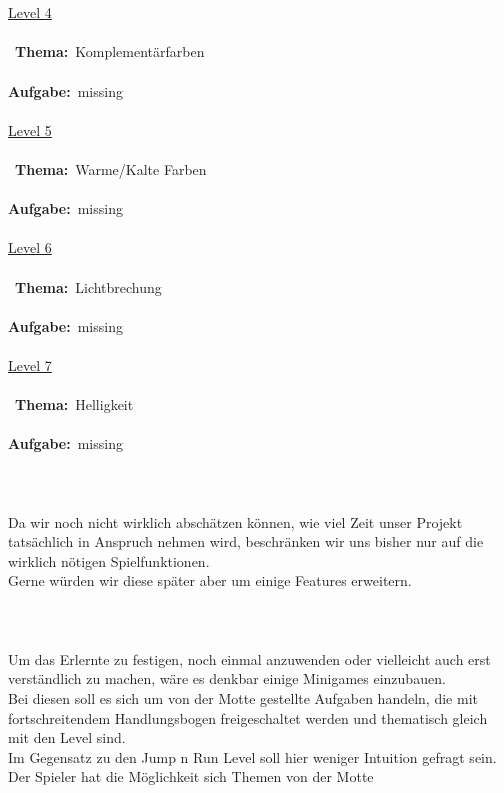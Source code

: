 \documentclass[10pt,a4paper,notitlepage]{report}
\begin{document}
	\\\\
	\underline{Level 4}\\\\\
	\textbf{Thema:}\
	Komplementärfarben
	\\\\
	\textbf{Aufgabe:}\
	missing
	\\\\
	\underline{Level 5}\\\\\
	\textbf{Thema:}\
	Warme/Kalte Farben
	\\\\
	\textbf{Aufgabe:}\
	missing
	\\\\
	\underline{Level 6}\\\\\
	\textbf{Thema:}\
	Lichtbrechung
	\\\\
	\textbf{Aufgabe:}\
	missing
	\\\\
	\underline{Level 7}\\\\\
	\textbf{Thema:}\
	Helligkeit
	\\\\
	\textbf{Aufgabe:}\
	missing
	\\
	\clearpage\
	\\
	\
	\\\\
	\Text
		Da wir noch nicht wirklich abschätzen können, wie viel Zeit unser Projekt tatsächlich in Anspruch nehmen wird, 
	beschränken wir uns bisher nur auf die wirklich nötigen Spielfunktionen. \\
	Gerne würden wir diese später aber um einige Features erweitern.
	\\\\
	\
	\\\\
	\Text
		Um das Erlernte zu festigen, noch einmal anzuwenden oder vielleicht auch erst verständlich zu machen, wäre es denkbar einige Minigames einzubauen.\\ 
	Bei diesen soll es sich um von der Motte gestellte Aufgaben handeln, die mit fortschreitendem Handlungsbogen freigeschaltet werden 
	und thematisch gleich mit den Level sind.\\
	Im Gegensatz zu den Jump n Run Level soll hier weniger Intuition gefragt sein. Der Spieler hat die Möglichkeit sich Themen von der Motte 
\end{document}
